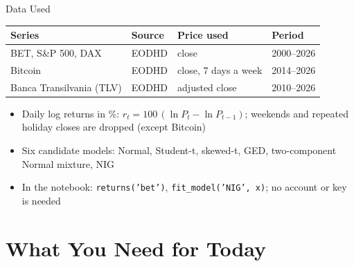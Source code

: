 \begin{frame}{Data Used}
\itemsize{\small}
\begin{center}
\footnotesize
\begin{tabular}{llll}
\toprule
\textbf{Series} & \textbf{Source} & \textbf{Price used} & \textbf{Period} \\
\midrule
BET, S\&P 500, DAX & EODHD & close & 2000--2026 \\
Bitcoin & EODHD & close, 7 days a week & 2014--2026 \\
Banca Transilvania (TLV) & EODHD & adjusted close & 2010--2026 \\
\bottomrule
\end{tabular}
\end{center}
\begin{itemize}
    \item Daily log returns in \%: $r_t = 100\,(\ln P_t - \ln P_{t-1})$; weekends and repeated holiday closes are dropped (except Bitcoin)
    \item Six candidate models: Normal, Student-t, skewed-t, GED, two-component Normal mixture, NIG
    \item In the notebook: \texttt{returns('bet')}, \texttt{fit\_model('NIG', x)}; no account or key is needed
\end{itemize}
\end{frame}


\section{What You Need for Today}

